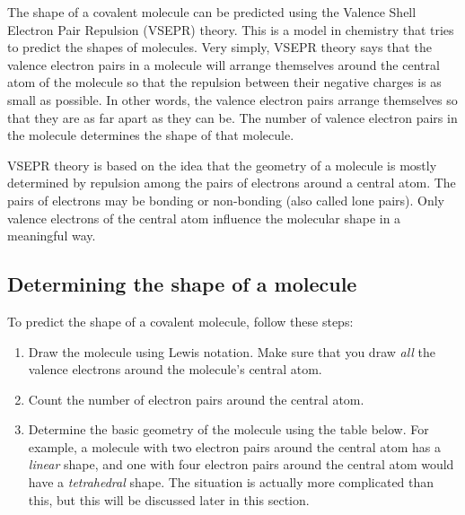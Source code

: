 The shape of a covalent molecule can be predicted using the Valence Shell Electron Pair Repulsion (VSEPR) theory. This is a model in chemistry that tries to predict the shapes of molecules. Very simply, VSEPR theory says that the valence electron pairs in a molecule will arrange themselves around the central atom of the molecule so that the repulsion between their negative charges is as small as possible. In other words, the valence electron pairs arrange themselves so that they are as far apart as they can be. The number of valence electron pairs in the molecule determines the shape of that molecule.


VSEPR theory is based on the idea that the geometry of a molecule is mostly determined by repulsion among the pairs of electrons around a central atom. The pairs of electrons may be bonding or non-bonding (also called lone pairs). Only valence electrons of the central atom influence the molecular shape in a meaningful way.

\subsection{Determining the shape of a molecule}

To predict the shape of a covalent molecule, follow these steps:

\begin{enumerate}[label=\textbf{Step \arabic*}:]
\item Draw the molecule using Lewis notation. Make sure that you draw \textit{all} the valence electrons around the molecule's central atom.
\item Count the number of electron pairs around the central atom.
\item Determine the basic geometry of the molecule using the table below. For example, a molecule with two electron pairs around the central atom has a \textit{linear} shape, and one with four electron pairs around the central atom would have a \textit{tetrahedral} shape. The situation is actually more complicated than this, but this will be discussed later in this section.
\end{enumerate}

